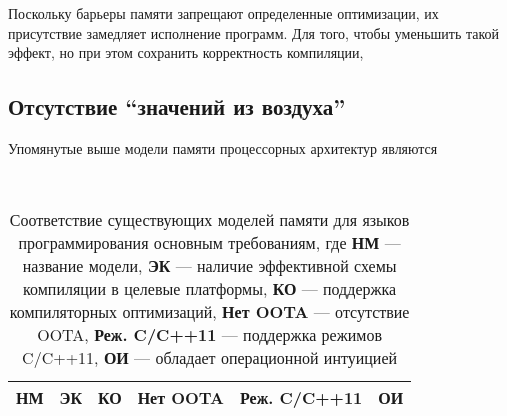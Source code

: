 Поскольку барьеры памяти запрещают определенные оптимизации, их присутствие замедляет исполнение программ.
Для того, чтобы уменьшить такой эффект, но при этом сохранить корректность компиляции, 



\subsection{Отсутствие ``значений из воздуха''}





Упомянутые выше модели памяти процессорных архитектур являются 


 \\
\cite{Batty-al:ESOP15}

\begin{table}[t]
  \begin{center}
  \begin{tabular}{r || l | l | l | l | l}
    {\bf НМ}& {\bf ЭК} & {\bf КО} & {\bf Нет OOTA} & {\bf Реж. C/C++11} & {\bf ОИ}  \\
    \midrule
  \end{tabular}
  \end{center}
  \label{tbl:plmmrequirements}
  \caption{Соответствие существующих моделей памяти для языков программирования основным требованиям, где
    {\bf НМ} --- название модели,
    {\bf ЭК} --- наличие эффективной схемы компиляции в целевые платформы,
    {\bf КО} --- поддержка компиляторных оптимизаций,
    {\bf Нет OOTA} --- отсутствие OOTA,
    {\bf Реж. C/C++11} --- поддержка режимов C/C++11,
    {\bf ОИ} --- обладает операционной интуицией
  }
\end{table}

